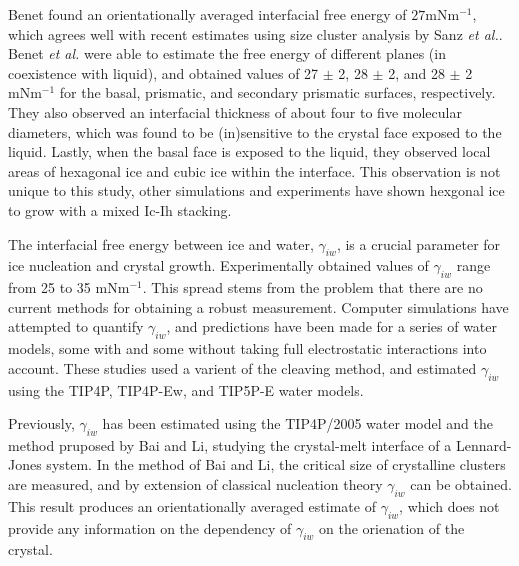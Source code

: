 Benet found an orientationally averaged interfacial free energy of
$27 \mathrm{mN} \mathrm{m}^{-1}$, which agrees well with recent
estimates using size cluster analysis by Sanz \textit{et
  al.}\cite{Sanz2013}. Benet \textit{et al.} were able to estimate the
free energy of different planes (in coexistence with liquid), and
obtained values of 27 $\pm$ 2, 28 $\pm$ 2, and 28 $\pm$ 2
$\mathrm{mN} \mathrm{m}^{-1}$ for the basal, prismatic, and secondary
prismatic surfaces, respectively. They also observed an interfacial
thickness of about four to five molecular diameters, which was found
to be (in)sensitive to the crystal face exposed to the liquid. Lastly,
when the basal face is exposed to the liquid, they observed local
areas of hexagonal ice and cubic ice within the interface. This
observation is not unique to this study, other simulations and
experiments have shown hexgonal ice to grow with a mixed Ic-Ih
stacking.\cite{43-47}

The interfacial free energy between ice and water, $\gamma_{iw}$, is a
crucial parameter for ice nucleation and crystal growth.\cite{1,2}
Experimentally obtained values of $\gamma_{iw}$ range from 25 to 35
$\mathrm{mN} \mathrm{m}^{-1}$.\cite{1} This spread stems from the
problem that there are no current methods for obtaining a robust
measurement. Computer simulations have attempted to quantify
$\gamma_{iw}$, and predictions have been made for a series of water
models, some with\cite{4} and some without\cite{5} taking full
electrostatic interactions into account. These studies used a varient
of the cleaving method,\cite{6} and estimated $\gamma_{iw}$ using the
TIP4P, TIP4P-Ew, and TIP5P-E water models.

Previously, $\gamma_{iw}$ has been estimated using the TIP4P/2005
water model and the method pruposed by Bai and Li, studying the
crystal-melt interface of a Lennard-Jones system.\cite{10} In the
method of Bai and Li, the critical size of crystalline clusters are
measured, and by extension of classical nucleation theory
$\gamma_{iw}$ can be obtained.\cite{11,12} This result produces an
orientationally averaged estimate of $\gamma_{iw}$, which does not
provide any information on the dependency of $\gamma_{iw}$ on the
orienation of the crystal.








